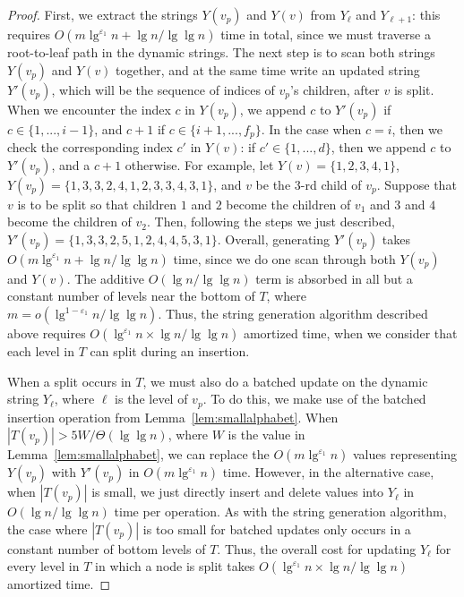 \documentclass{llncs}
\begin{document}
\begin{proof}
First, we extract the strings $Y(v_p)$ and $Y(v)$ from $Y_\ell$ and
$Y_{\ell+1}$: this requires $O(m \lg^{\varepsilon_1}n + \lg n / \lg
\lg n)$ time in total, since we must traverse a root-to-leaf path in
the dynamic strings.  The next step is to scan both strings $Y(v_p)$
and $Y(v)$ together, and at the same time write an updated string
$Y'(v_p)$, which will be the sequence of indices of $v_p$'s children,
after $v$ is split.  When we encounter the index $c$ in $Y(v_p)$, we
append $c$ to $Y'(v_p)$ if $c \in \{1 ,..., i-1\}$, and $c+1$ if $c
\in \{i+1,...,f_p\}$.  In the case when $c = i$, then we check the
corresponding index $c'$ in $Y(v)$: if $c' \in \{ 1,..., d\}$, then we
append $c$ to $Y'(v_p)$, and a $c+1$ otherwise.  For example, let
$Y(v) = \{ 1,2,3,4,1 \}$, $Y(v_p) = \{1,3,3,2,4,1,2,3,3,4,3,1\}$, and
$v$ be the $3$-rd child of $v_p$.  Suppose that $v$ is to be split so
that children $1$ and $2$ become the children of $v_1$ and $3$ and $4$
become the children of $v_2$.  Then, following the steps we just
described, $Y'(v_p) = \{ 1,3,3,2,5,1,2,4,4,5,3,1\}$.  Overall,
generating $Y'(v_p)$ takes $O(m \lg^{\varepsilon_1}n + \lg n / \lg \lg
n)$ time, since we do one scan through both $Y(v_p)$ and $Y(v)$.  The
additive $O(\lg n / \lg \lg n)$ term is absorbed in all but a constant
number of levels near the bottom of $T$, where $m =
o(\lg^{1-\varepsilon_1}n / \lg \lg n)$.  Thus, the string generation
algorithm described above requires $O(\lg^{\varepsilon_1}n \times \lg
n / \lg \lg n)$ amortized time, when we consider that each level in
$T$ can split during an insertion.

When a split occurs in $T$, we must also do a batched update on the
dynamic string $Y_\ell$, where $\ell$ is the level of $v_p$.  To do
this, we make use of the batched insertion operation from
Lemma~\ref{lem:smallalphabet}.  When $|T(v_p)| > 5W / \Theta(\lg \lg
n) $, where $W$ is the value in Lemma~\ref{lem:smallalphabet}, we can
replace the $O(m \lg^{\varepsilon_1}n)$ values representing $Y(v_p)$
with $Y'(v_p)$ in $O(m \lg^{\varepsilon_1}n)$ time.  However, in the
alternative case, when $|T(v_p)|$ is small, we just directly insert
and delete values into $Y_\ell$ in $O(\lg n / \lg \lg n)$ time per
operation.  As with the string generation algorithm, the case where
$|T(v_p)|$ is too small for batched updates only occurs in a constant
number of bottom levels of $T$.  Thus, the overall cost for updating
$Y_\ell$ for every level in $T$ in which a node is split takes
$O(\lg^{\varepsilon_1}n \times \lg n / \lg \lg n)$ amortized time.


\end{proof}
\end{document}

